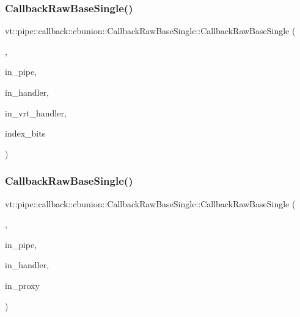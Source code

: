 \subsubsection{\texorpdfstring{Callback\+Raw\+Base\+Single()}{CallbackRawBaseSingle()}\hspace{0.1cm}{\footnotesize\ttfamily [11/13]}}
{\footnotesize\ttfamily vt\+::pipe\+::callback\+::cbunion\+::\+Callback\+Raw\+Base\+Single\+::\+Callback\+Raw\+Base\+Single (\begin{DoxyParamCaption}\item[{Raw\+Send\+Col\+Dir\+Tag\+Type}]{,  }\item[{\hyperlink{namespacevt_ac9852acda74d1896f48f406cd72c7bd3}{Pipe\+Type} const \&}]{in\+\_\+pipe,  }\item[{\hyperlink{namespacevt_af64846b57dfcaf104da3ef6967917573}{Handler\+Type} const}]{in\+\_\+handler,  }\item[{\hyperlink{structvt_1_1pipe_1_1callback_1_1cbunion_1_1_callback_raw_base_single_a734a9c83099de5bc1cd85f9da8dba7bb}{Auto\+Handler\+Type} const}]{in\+\_\+vrt\+\_\+handler,  }\item[{void $\ast$}]{index\+\_\+bits }\end{DoxyParamCaption})}

\mbox{\label{structvt_1_1pipe_1_1callback_1_1cbunion_1_1_callback_raw_base_single_a2ff2eebe15a6b270473f61cfa2a9804a}} 
\subsubsection{\texorpdfstring{Callback\+Raw\+Base\+Single()}{CallbackRawBaseSingle()}\hspace{0.1cm}{\footnotesize\ttfamily [12/13]}}
{\footnotesize\ttfamily vt\+::pipe\+::callback\+::cbunion\+::\+Callback\+Raw\+Base\+Single\+::\+Callback\+Raw\+Base\+Single (\begin{DoxyParamCaption}\item[{Raw\+Bcast\+Obj\+Grp\+Tag\+Type}]{,  }\item[{\hyperlink{namespacevt_ac9852acda74d1896f48f406cd72c7bd3}{Pipe\+Type}}]{in\+\_\+pipe,  }\item[{\hyperlink{namespacevt_af64846b57dfcaf104da3ef6967917573}{Handler\+Type}}]{in\+\_\+handler,  }\item[{\hyperlink{namespacevt_ad7cae989df485fccca57f0792a880a8e}{Obj\+Group\+Proxy\+Type}}]{in\+\_\+proxy }\end{DoxyParamCaption})}

